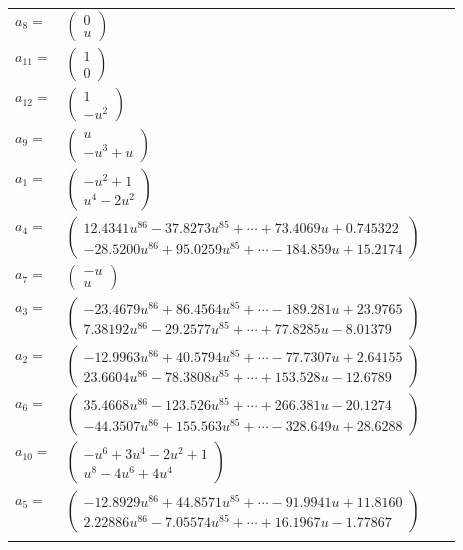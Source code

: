 \documentclass[1p]{elsarticle_modified}
\theoremstyle{definition}
\begin{document}
\begin{tabular}{m{7pt} m{180pt} m{7pt} m{180pt} }
\flushright $a_{8}=$&$\begin{pmatrix}0\\u\end{pmatrix}$ \\
\flushright $a_{11}=$&$\begin{pmatrix}1\\0\end{pmatrix}$ \\
\flushright $a_{12}=$&$\begin{pmatrix}1\\- u^2\end{pmatrix}$ \\
\flushright $a_{9}=$&$\begin{pmatrix}u\\- u^3+u\end{pmatrix}$ \\
\flushright $a_{1}=$&$\begin{pmatrix}- u^2+1\\u^4-2 u^2\end{pmatrix}$ \\
\flushright $a_{4}=$&$\begin{pmatrix}12.4341 u^{86}-37.8273 u^{85}+\cdots+73.4069 u+0.745322\\-28.5200 u^{86}+95.0259 u^{85}+\cdots-184.859 u+15.2174\end{pmatrix}$ \\
\flushright $a_{7}=$&$\begin{pmatrix}- u\\u\end{pmatrix}$ \\
\flushright $a_{3}=$&$\begin{pmatrix}-23.4679 u^{86}+86.4564 u^{85}+\cdots-189.281 u+23.9765\\7.38192 u^{86}-29.2577 u^{85}+\cdots+77.8285 u-8.01379\end{pmatrix}$ \\
\flushright $a_{2}=$&$\begin{pmatrix}-12.9963 u^{86}+40.5794 u^{85}+\cdots-77.7307 u+2.64155\\23.6604 u^{86}-78.3808 u^{85}+\cdots+153.528 u-12.6789\end{pmatrix}$ \\
\flushright $a_{6}=$&$\begin{pmatrix}35.4668 u^{86}-123.526 u^{85}+\cdots+266.381 u-20.1274\\-44.3507 u^{86}+155.563 u^{85}+\cdots-328.649 u+28.6288\end{pmatrix}$ \\
\flushright $a_{10}=$&$\begin{pmatrix}- u^6+3 u^4-2 u^2+1\\u^8-4 u^6+4 u^4\end{pmatrix}$ \\
\flushright $a_{5}=$&$\begin{pmatrix}-12.8929 u^{86}+44.8571 u^{85}+\cdots-91.9941 u+11.8160\\2.22886 u^{86}-7.05574 u^{85}+\cdots+16.1967 u-1.77867\end{pmatrix}$\\&\end{tabular}
\end{document}
